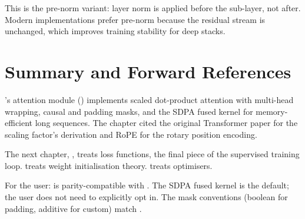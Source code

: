 This is the pre-norm variant: layer norm is applied before the
sub-layer, not after. Modern implementations prefer pre-norm
because the residual stream is unchanged, which improves training
stability for deep stacks.

\section{Summary and Forward References}
\label{sec:attention:summary}

\Lucid's attention module
() implements scaled dot-product
attention with multi-head wrapping, causal and padding masks, and
the SDPA fused kernel for memory-efficient long sequences. The
chapter cited the original Transformer paper
\cite{vaswani_attention_2017} for the scaling factor's derivation
and RoPE \cite{su_roformer_2021} for the rotary position
encoding.

The next chapter, , treats loss functions, the
final piece of the supervised training loop.
 treats weight initialisation theory.
 treats optimisers.

\begin{lucidnote}
For the user:  is parity-compatible
with . The SDPA fused kernel is the default; the
user does not need to explicitly opt in. The mask conventions
(boolean for padding, additive for custom) match .
\end{lucidnote}
